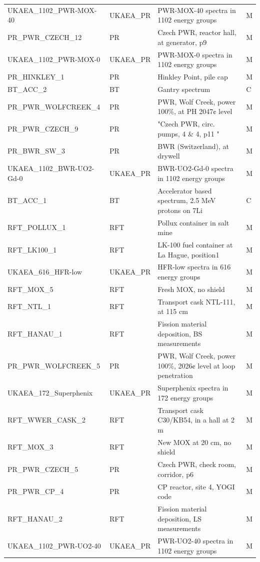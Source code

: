 \documentclass[a4paper, 12pt]{article}
\begin{document}
\begin{appendices}
\begin{longtable}{llll}
UKAEA\_1102\_PWR-MOX-40 & UKAEA\_PR & PWR-MOX-40 spectra in 1102 energy groups & M\\
PR\_PWR\_CZECH\_12 & PR & Czech PWR, reactor hall, at generator, p9  & M\\
UKAEA\_1102\_PWR-MOX-0 & UKAEA\_PR & PWR-MOX-0 spectra in 1102 energy groups & M\\
PR\_HINKLEY\_1 & PR & Hinkley Point, pile cap  & M\\
BT\_ACC\_2 & BT & Gantry spectrum  & C\\
PR\_PWR\_WOLFCREEK\_4 & PR & PWR, Wolf Creek, power 100\%, at PH 2047¢ level  & M\\
PR\_PWR\_CZECH\_9 & PR & "Czech PWR, circ. pumps, 4 \& 4, p11 " & M\\
PR\_BWR\_SW\_3 & PR & BWR (Switzerland), at drywell  & M\\
UKAEA\_1102\_BWR-UO2-Gd-0 & UKAEA\_PR & BWR-UO2-Gd-0 spectra in 1102 energy groups & M\\
BT\_ACC\_1 & BT & Accelerator based spectrum, 2.5 MeV protons on 7Li  & C\\
RFT\_POLLUX\_1 & RFT & Pollux container in salt mine  & M\\
RFT\_LK100\_1 & RFT & LK-100 fuel container at La Hague, position1  & M\\
UKAEA\_616\_HFR-low & UKAEA\_PR & HFR-low spectra in 616 energy groups & M\\
RFT\_MOX\_5 & RFT & Fresh MOX, no shield  & M\\
RFT\_NTL\_1 & RFT & Transport cask NTL-111, at 115 cm  & M\\
RFT\_HANAU\_1 & RFT & Fission material deposition, BS measurements  & M\\
PR\_PWR\_WOLFCREEK\_5 & PR & PWR, Wolf Creek, power 100\%, 2026¢ level at loop penetration  & M\\
UKAEA\_172\_Superphenix & UKAEA\_PR & Superphenix spectra in 172 energy groups & M\\
RFT\_WWER\_CASK\_2 & RFT & Transport cask C30/KB54, in a hall at 2 m  & M\\
RFT\_MOX\_3 & RFT & New MOX at 20 cm, no shield  & M\\
PR\_PWR\_CZECH\_5 & PR & Czech PWR, check room, corridor, p6  & M\\
PR\_PWR\_CP\_4 & PR & CP reactor, site 4, YOGI code  & M\\
RFT\_HANAU\_2 & RFT & Fission material deposition, LS measurements  & M\\
UKAEA\_1102\_PWR-UO2-40 & UKAEA\_PR & PWR-UO2-40 spectra in 1102 energy groups & M\\

\end{longtable}
\end{appendices}
\end{document}
